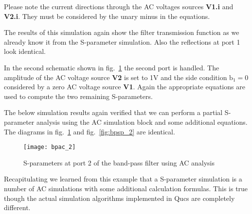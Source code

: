 \medskip

Please note the current directions through the AC voltages sources
\textbf{V1.i} and \textbf{V2.i}.  They must be considered by the unary
minus in the equations.

\medskip

The results of this simulation again show the filter transmission
function as we already know it from the S-parameter simulation.  Also
the reflections at port 1 look identical.

\medskip

In the second schematic shown in fig.~\ref{fig:bpac_2} the second port
is handled.  The amplitude of the AC voltage source \textbf{V2} is set
to 1V and the side condition $\mathrm{b_1=0}$ considered by a zero AC
voltage source \textbf{V1}.  Again the appropriate equations are used
to compute the two remaining S-parameters.

\medskip

The below simulation results again verified that we can perform a
partial S-parameter analysis using the AC simulation block and some
additional equations.  The diagrams in fig.~\ref{fig:bpac_2} and
fig.~\ref{fig:bpsp_2} are identical.

\begin{figure}[ht]
  \centering
  \texttt{[image: bpac\_2]}
  \caption{S-parameters at port 2 of the band-pass filter using AC analysis}
  \label{fig:bpac_2}
\end{figure}
\FloatBarrier

Recapitulating we learned from this example that a S-parameter
simulation is a number of AC simulations with some additional
calculation formulas.  This is true though the actual simulation
algorithms implemented in Qucs are completely different.
